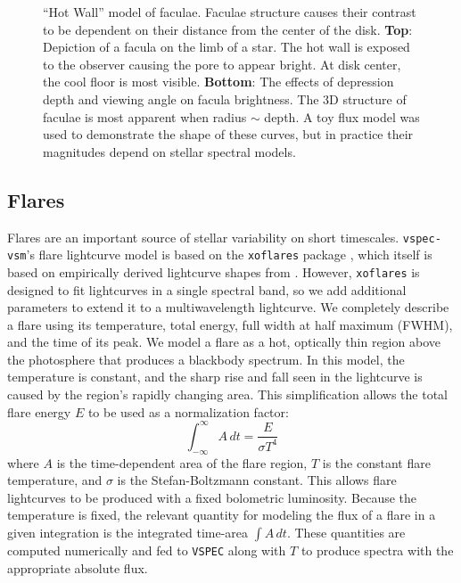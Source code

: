 \documentclass[twocolumn]{aastex631}
\newcommand{\vspec}[1]{\texttt{VSPEC}#1}
\begin{document}
\begin{figure}
    \centering
    \caption{
        ``Hot Wall'' model of faculae. Faculae structure causes their contrast to be dependent on their distance from the center of the disk. {\bf Top}: Depiction of a facula on the limb of a star. The hot wall is exposed to the observer causing the pore to appear bright. At disk center, the cool floor is most visible. {\bf Bottom}: The effects of depression depth and viewing angle on facula brightness. The 3D structure of faculae is most apparent when radius $\sim$ depth. A toy flux model was used to demonstrate the shape of these curves, but in practice their magnitudes depend on stellar spectral models.
        }
    \label{fig:fac_struct}
\end{figure}

\subsection{Flares \label{subsec:flares}}
Flares are an important source of stellar variability on short timescales. \texttt{vspec-vsm}'s flare lightcurve model is based on the \texttt{xoflares} package \citep{barclay2020}, which itself is based on empirically derived lightcurve shapes from \citet{davenport2016}. However, \texttt{xoflares} is designed to fit lightcurves in a single spectral band, so we add additional parameters to extend it to a multiwavelength lightcurve. We completely describe a flare using its temperature, total energy, full width at half maximum (FWHM), and the time of its peak. We model a flare as a hot, optically thin region above the photosphere that produces a blackbody spectrum. In this model, the temperature is constant, and the sharp rise and fall seen in the lightcurve is caused by the region's rapidly changing area. This simplification allows the total flare energy $E$ to be used as a normalization factor:
\begin{equation}
    \int_{-\infty}^{\infty}A\,dt = \frac{E}{\sigma T^4}
\end{equation}
where $A$ is the time-dependent area of the flare region, $T$ is the constant flare temperature, and $\sigma$ is the Stefan-Boltzmann constant. This allows flare lightcurves to be produced with a fixed bolometric luminosity. Because the temperature is fixed, the relevant quantity for modeling the flux of a flare in a given integration is the integrated time-area $\int A\,dt$. These quantities are computed numerically and fed to \vspec{} along with $T$ to produce spectra with the appropriate absolute flux.
\end{document}
